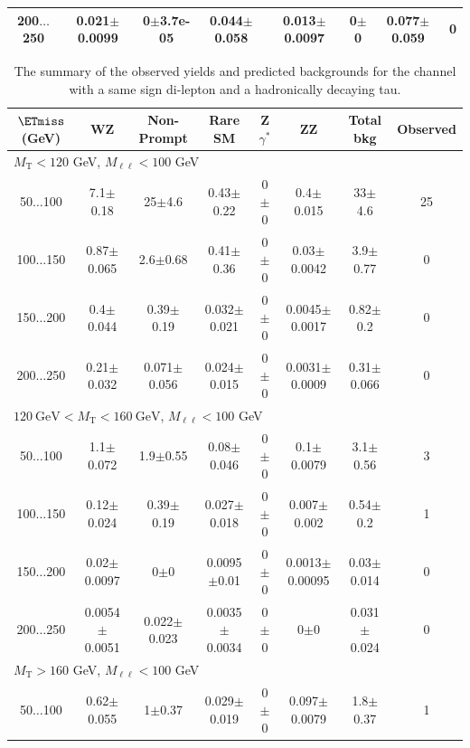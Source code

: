 \begin{landscape}
\begin{table}
\begin{center}
\begin{tabular}{| c | c c c c c c c | }
200$\dots$250&0.021$\pm$0.0099&0$\pm$3.7e-05&0.044$\pm$0.058&0.013$\pm$0.0097&0$\pm$0&0.077$\pm$0.059&0\\
\hline\hline
\end{tabular}
\end{center}
\end{table}
\begin{table}
\small
\begin{center}
\caption{\label{tab:SStau1} The summary of the observed yields and predicted backgrounds for the channel 
with a same sign di-lepton and a hadronically decaying tau. }
\begin{tabular}{| c | c c c c c c c | }\hline\hline
$\ETmiss$ (GeV) & WZ & Non-Prompt & Rare SM & Z$\gamma^*$ & ZZ & Total bkg & Observed\\\hline\hline
\multicolumn{8}{l}{$M_{\text{T}} < 120$ GeV, $M_{\ell\ell} < 100$ GeV}\\\hline\hline
50$\dots$100&7.1$\pm$0.18&25$\pm$4.6&0.43$\pm$0.22&0$\pm$0&0.4$\pm$0.015&33$\pm$4.6&25\\
100$\dots$150&0.87$\pm$0.065&2.6$\pm$0.68&0.41$\pm$0.36&0$\pm$0&0.03$\pm$0.0042&3.9$\pm$0.77&0\\
150$\dots$200&0.4$\pm$0.044&0.39$\pm$0.19&0.032$\pm$0.021&0$\pm$0&0.0045$\pm$0.0017&0.82$\pm$0.2&0\\
200$\dots$250&0.21$\pm$0.032&0.071$\pm$0.056&0.024$\pm$0.015&0$\pm$0&0.0031$\pm$0.0009&0.31$\pm$0.066&0\\
\hline\hline
\multicolumn{8}{l}{$120~\mathrm{GeV} < M_{\text{T}} < 160~\mathrm{GeV}$, $M_{\ell\ell} < 100$ GeV}\\\hline\hline
50$\dots$100&1.1$\pm$0.072&1.9$\pm$0.55&0.08$\pm$0.046&0$\pm$0&0.1$\pm$0.0079&3.1$\pm$0.56&3\\
100$\dots$150&0.12$\pm$0.024&0.39$\pm$0.19&0.027$\pm$0.018&0$\pm$0&0.007$\pm$0.002&0.54$\pm$0.2&1\\
150$\dots$200&0.02$\pm$0.0097&0$\pm$0&0.0095$\pm$0.01&0$\pm$0&0.0013$\pm$0.00095&0.03$\pm$0.014&0\\
200$\dots$250&0.0054$\pm$0.0051&0.022$\pm$0.023&0.0035$\pm$0.0034&0$\pm$0&0$\pm$0&0.031$\pm$0.024&0\\
\hline\hline
\multicolumn{8}{l}{$M_{\text{T}} > 160$ GeV, $M_{\ell\ell} < 100$ GeV}\\\hline\hline
50$\dots$100&0.62$\pm$0.055&1$\pm$0.37&0.029$\pm$0.019&0$\pm$0&0.097$\pm$0.0079&1.8$\pm$0.37&1\\

\end{tabular}
\end{center}
\end{table}
\end{landscape}
